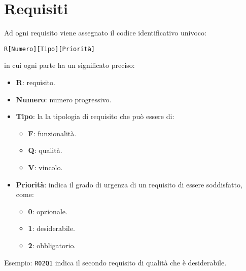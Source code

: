 \section{Requisiti}
Ad ogni requisito viene assegnato il codice identificativo univoco:
	\begin{center}
		\texttt{R[Numero][Tipo][Priorità]} 
	\end{center} 
	in cui ogni parte ha un significato preciso:
	\begin{itemize}
		\item \textbf{R}: requisito.
		\item \textbf{Numero}: numero progressivo.
		\item \textbf{Tipo}: la la tipologia di requisito che può essere di:
		\begin{itemize}
			\item \textbf{F}: funzionalità.
			\item \textbf{Q}: qualità.
			\item \textbf{V}: vincolo.
		\end{itemize}
		\item \textbf{Priorità}: indica il grado di urgenza di un requisito di essere soddisfatto, come:
		\begin{itemize}
			\item \textbf{0}: opzionale.
			\item \textbf{1}: desiderabile.
			\item \textbf{2}: obbligatorio.
		\end{itemize}
	\end{itemize}
	
	Esempio: \texttt{R02Q1} indica il secondo requisito di qualità che è desiderabile.
	
	

\newcommand{\decrZ}{\addtocounter{vaZ}{+1}} %
\newcommand{\addNumber}[0]{\thevaZ \decrZ} %
\addtocounter{vaZ}{1}%

